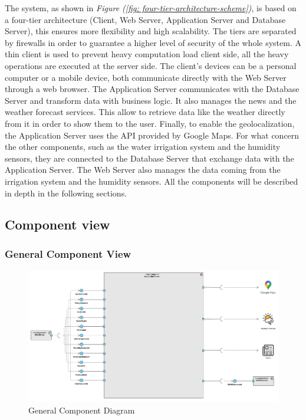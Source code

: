 \documentclass[table, 12pt]{article}
\begin{document}
The system, as shown in \textit{Figure (\ref{fig: four-tier-architecture-scheme})}, is based on a four-tier architecture (Client, Web Server, Application Server and Database Server), this ensures more flexibility and high scalability.
The tiers are separated by firewalls in order to guarantee a higher level of security of the whole system.
A thin client is used to prevent heavy computation load client side, all the heavy operations are executed at the server side.
The client's devices can be a personal computer or a mobile device, both communicate directly with the Web Server through a web browser.
The Application Server communicates with the Database Server and transform data with business logic.
It also manages the news and the weather forecast services.
This allow to retrieve data like the weather directly from it in order to show them to the user.
Finally, to enable the geolocalization, the Application Server uses the API provided by Google Maps.
For what concern the other components, such as the water irrigation system and the humidity sensors, they are connected to the Database Server that exchange data with the Application Server.
The Web Server also manages the data coming from the irrigation system and the humidity sensors.
All the components will be described in depth in the following sections.

\subsection{Component view}
\subsubsection*{General Component View}
\begin{center}
    \begin{figure}[H]
        \includegraphics[scale=0.50, center]{assets/general-component-view.jpg}
        \caption{General Component Diagram}
        \label{fig: general_component_view}
    \end{figure}
\end{center}
\end{document}
